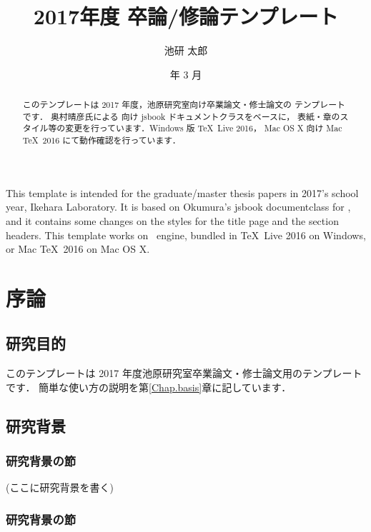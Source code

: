 \documentclass[dvipdfmx,disablejfam,nosetpagesize,12pt]{jsbook}
\title{2017年度 卒論/修論テンプレート}
\author{池研 太郎}
\date{\number\year 年 3 月}
\begin{document}
\frontmatter

\maketitleforcover

\maketitle

\begin{abstract}
このテンプレートは 2017 年度，池原研究室向け卒業論文・修士論文の
テンプレートです．
奥村晴彦氏による \pLaTeXe 向け jsbook ドキュメントクラスをベースに，
表紙・章のスタイル等の変更を行っています．Windows 版 \TeX\ Live 2016，
Mac OS X 向け Mac \TeX\ 2016 にて動作確認を行っています．
\end{abstract}

\begin{eabstract}
This template is intended for the graduate/master thesis papers in 2017's 
school year, Ikehara Laboratory.
It is based on Okumura's jsbook documentclass for \pLaTeXe, and
it contains some changes on the styles for the title page and the section headers.
This template works on \pLaTeX\ engine, bundled in \TeX\ Live 2016 on Windows,
or Mac \TeX\ 2016 on Mac OS X.
\end{eabstract}

\tableofcontents

\mainmatter

\chapter{序論}
\section{研究目的}
このテンプレートは 2017 年度池原研究室卒業論文・修士論文用のテンプレートです．
簡単な使い方の説明を第\ref{Chap.basis}章に記しています．

\section{研究背景}
\subsection{研究背景の節}
(ここに研究背景を書く)
\subsection{研究背景の節}
\end{document}
